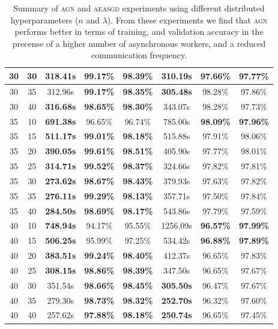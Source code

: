 \begin{table}
\begin{tabular}{|c|c|c|c|c|c|c|c|}
\hline
30 & 30 & 318.41s & \textbf{99.17\%} & \textbf{98.39\%} & \textbf{310.19s} & 97.66\% & 97.77\%  \\
\hline
30 & 35 & 312.96s & \textbf{99.17\%} & \textbf{98.35\%} & \textbf{305.48s} & 98.28\% & 97.86\%  \\
\hline
30 & 40 & \textbf{316.68s} & \textbf{98.65\%} & \textbf{98.30\%} & 343.07s & 98.28\% & 97.73\%  \\
\hline
35 & 10 & \textbf{691.38s} & 96.65\% & 96.74\% & 785.00s & \textbf{98.09\%} & \textbf{97.96\%}  \\
\hline
35 & 15 & \textbf{511.17s} & \textbf{99.01\%} & \textbf{98.18\%} & 515.88s & 97.91\% & 98.06\%  \\
\hline
35 & 20 & \textbf{390.05s} & \textbf{99.61\%} & \textbf{98.51\%} & 405.90s & 97.77\% & 98.01\%  \\
\hline
35 & 25 & \textbf{314.71s} & \textbf{99.52\%} & \textbf{98.37\%} & 324.66s & 97.82\% & 97.81\%  \\
\hline
35 & 30 & \textbf{273.62s} & \textbf{98.67\%} & \textbf{98.43\%} & 379.93s & 97.63\% & 97.82\%  \\
\hline
35 & 35 & \textbf{276.11s} & \textbf{99.29\%} & \textbf{98.13\%} & 357.71s & 97.50\% & 97.84\%  \\
\hline
35 & 40 & \textbf{284.50s} & \textbf{98.69\%} & \textbf{98.17\%} & 543.86s & 97.79\% & 97.59\%  \\
\hline
40 & 10 & \textbf{748.94s} & 94.17\% & 95.55\% & 1256.09s & \textbf{96.57\%} & \textbf{97.99\%}  \\
\hline
40 & 15 & \textbf{506.25s} & 95.99\% & 97.25\% & 534.42s & \textbf{96.88\%} & \textbf{97.89\%}  \\
\hline
40 & 20 & \textbf{383.51s} & \textbf{99.24\%} & \textbf{98.40\%} & 412.37s & 96.65\% & 97.83\%  \\
\hline
40 & 25 & \textbf{308.15s} & \textbf{98.86\%} & \textbf{98.39\%} & 347.50s & 96.65\% & 97.67\%  \\
\hline
40 & 30 & 351.54s & \textbf{98.66\%} & \textbf{98.45\%} & \textbf{305.50s} & 96.47\% & 97.67\%  \\
\hline
40 & 35 & 279.30s & \textbf{98.73\%} & \textbf{98.32\%} & \textbf{252.70s} & 96.32\% & 97.60\%  \\
\hline
40 & 40 & 257.62s & \textbf{97.88\%} & \textbf{98.18\%} & \textbf{250.74s} & 96.65\% & 97.45\%  \\
\hline
  \end{tabular}
  \caption{Summary of \textsc{agn} and \textsc{aeasgd} experiments using different distributed hyperparameters ($n$ and $\lambda$). From these experiments we find that \textsc{agn} performs better in terms of training, and validation accuracy in the precense of a higher number of asynchronous workers, and a reduced communication frequency.}
  \label{table:agn_experiments_summary}
\end{table}

